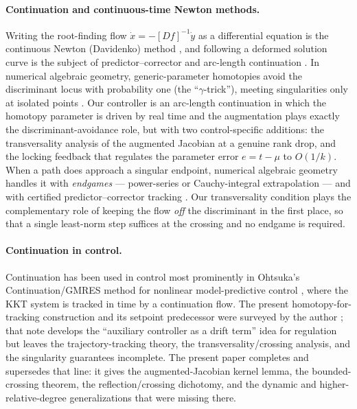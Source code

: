 \documentclass[11pt,american]{article}
\theoremstyle{definition}
\theoremstyle{plain}
\theoremstyle{remark}
\begin{document}
\paragraph{Continuation and continuous-time Newton methods.} Writing the root-finding flow $\dot x = -[Df]^{-1}\dot y$ as a differential equation is the continuous Newton (Davidenko) method \cite{Davidenko1953}, and following a deformed solution curve is the subject of predictor--corrector and arc-length continuation \cite{AllgowerGeorg1990}. In numerical algebraic geometry, generic-parameter homotopies avoid the discriminant locus with probability one (the ``$\gamma$-trick''), meeting singularities only at isolated points \cite{SommeseWampler2005}. Our controller is an arc-length continuation in which the homotopy parameter is driven by real time and the augmentation plays exactly the discriminant-avoidance role, but with two control-specific additions: the transversality analysis of the augmented Jacobian at a genuine rank drop, and the locking feedback that regulates the parameter error $e = t-\mu$ to $O(1/k)$. When a path does approach a singular endpoint, numerical algebraic geometry handles it with \emph{endgames} --- power-series or Cauchy-integral extrapolation --- and with certified predictor--corrector tracking \cite{Bertini2013,BeltranLeykin2012}. Our transversality condition plays the complementary role of keeping the flow \emph{off} the discriminant in the first place, so that a single least-norm step suffices at the crossing and no endgame is required.

\paragraph{Continuation in control.} Continuation has been used in control most prominently in Ohtsuka's Continuation/GMRES method for nonlinear model-predictive control \cite{Ohtsuka2004}, where the KKT system is tracked in time by a continuation flow. The present homotopy-for-tracking construction and its setpoint predecessor were surveyed by the author \cite{Borisevich2013}; that note develops the ``auxiliary controller as a drift term'' idea for regulation but leaves the trajectory-tracking theory, the transversality/crossing analysis, and the singularity guarantees incomplete. The present paper completes and supersedes that line: it gives the augmented-Jacobian kernel lemma, the bounded-crossing theorem, the reflection/crossing dichotomy, and the dynamic and higher-relative-degree generalizations that were missing there.
\end{document}
